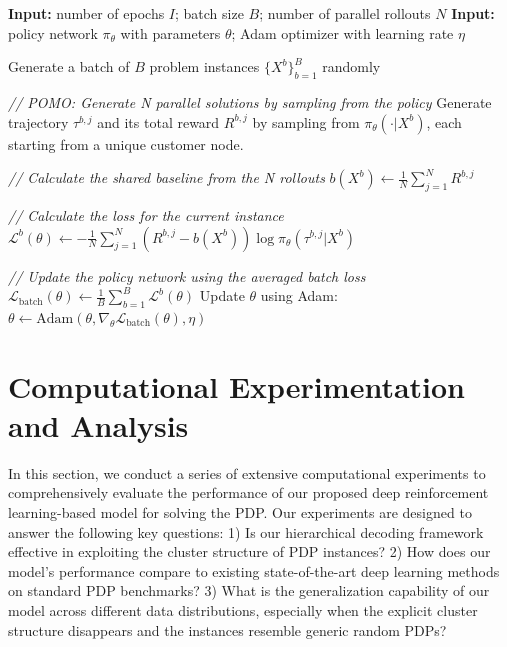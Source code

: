 \documentclass[pdflatex,sn-basic,Numbered]{sn-jnl}
\begin{document}
\begin{algorithm}[!htbp]
\caption{POMO-based Reinforcement Learning Algorithm}
\label{alg:pomo_rl_professional}
\begin{algorithmic}[1]
    \State \textbf{Input:} number of epochs $I$; batch size $B$; number of parallel rollouts $N$
    \State \textbf{Input:} policy network $\pi_{\theta}$ with parameters $\theta$; Adam optimizer with learning rate $\eta$

        \State Generate a batch of $B$ problem instances $\{X^b\}_{b=1}^B$ randomly

            \State \textit{// POMO: Generate N parallel solutions by sampling from the policy}
                \State Generate trajectory $\tau^{b,j}$ and its total reward $R^{b,j}$ by sampling from
                \Statex \qquad $\pi_{\theta}(\cdot|X^b)$, each starting from a unique customer node.
            \EndFor

            \State \textit{// Calculate the shared baseline from the N rollouts}
            \State $b(X^b) \leftarrow \frac{1}{N} \sum_{j=1}^{N} R^{b,j}$

            \State \textit{// Calculate the loss for the current instance}
            \State $\mathcal{L}^b(\theta) \leftarrow -\frac{1}{N} \sum_{j=1}^{N} (R^{b,j} - b(X^b)) \log \pi_{\theta}(\tau^{b,j}|X^b)$
        \EndFor

        \State \textit{// Update the policy network using the averaged batch loss}
        \State $\mathcal{L}_{\text{batch}}(\theta) \leftarrow \frac{1}{B} \sum_{b=1}^{B} \mathcal{L}^b(\theta)$
        \State Update $\theta$ using Adam: $\theta \leftarrow \text{Adam}(\theta, \nabla_{\theta}\mathcal{L}_{\text{batch}}(\theta), \eta)$
    \EndFor
\end{algorithmic}
\end{algorithm}

\section{Computational Experimentation and Analysis}\label{sec:experiments}

In this section, we conduct a series of extensive computational experiments to comprehensively evaluate the performance of our proposed deep reinforcement learning-based model for solving the PDP. Our experiments are designed to answer the following key questions: 1) Is our hierarchical decoding framework effective in exploiting the cluster structure of PDP instances? 2) How does our model's performance compare to existing state-of-the-art deep learning methods on standard PDP benchmarks? 3) What is the generalization capability of our model across different data distributions, especially when the explicit cluster structure disappears and the instances resemble generic random PDPs?
\end{document}
